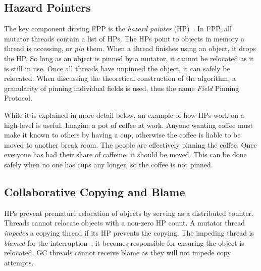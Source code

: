 \documentclass{sig-alternate}
\begin{document}
\subsection{Hazard Pointers}
\label{sec:fppHazard}

The key component driving FPP is the \emph{hazard pointer} (HP)~\cite{Osterlund:FPP}. 
In FPP, all mutator threads contain a list of HPs.
The HPs point to objects in memory a thread is accessing, or \emph{pin} them.
When a thread finishes using an object, it drops the HP.
So long as an object
is pinned by a mutator, it cannot be relocated as it is still in use. Once all threads have
unpinned the object, it can safely be relocated.
When discussing the theoretical construction of the algorithm, a granularity of pinning 
individual fields is used, thus the name \emph{Field} Pinning Protocol. 

While it is explained in more detail below, an example of how HPs 
work on a high-level is useful. Imagine a pot of coffee at work. Anyone 
wanting coffee must make it known to others by having a cup, otherwise the 
coffee is liable to be moved to another break room. The people are effectively pinning the coffee.
Once everyone has had their share of caffeine, it should be moved. This can
be done safely when no one has cups any longer, so the coffee is not pinned.



\subsection{Collaborative Copying and Blame}
\label{sec:fppCopy}

HPs prevent premature relocation of objects by serving as a distributed
counter. Threads cannot relocate objects with a non-zero HP count.
A mutator thread \emph{impedes} a copying thread if
its HP prevents the copying.
The impeding thread is \emph{blamed} for the 
interruption~\cite{Osterlund:FPP}; it becomes responsible for ensuring 
the object is relocated. GC threads cannot receive blame as they will not impede
copy attempts.
\end{document}

